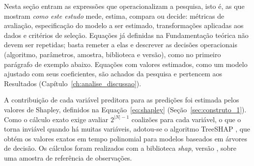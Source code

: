 \begin{orientacao}
  Nesta seção entram as expressões que operacionalizam a pesquisa, isto é, as que mostram \emph{como este estudo} mede, estima, compara ou decide: métricas de avaliação, especificação do modelo a ser estimado, transformações aplicadas aos dados e critérios de seleção. Equações já definidas na Fundamentação teórica não devem ser repetidas; basta remeter a elas e descrever as decisões operacionais (algoritmo, parâmetros, amostra, biblioteca e versão), como no primeiro parágrafo de exemplo abaixo. Equações com valores estimados, como um modelo ajustado com seus coeficientes, são achados da pesquisa e pertencem aos Resultados (Capítulo~\ref{ch:analise_discussao}).
\end{orientacao}

A contribuição de cada variável preditora para as predições foi estimada pelos valores de Shapley, definidos na Equação~\eqref{eq:shapley} (Seção~\ref{sec:construto_1}). Como o cálculo exato exige avaliar $2^{|N|-1}$ coalizões para cada variável, o que o torna inviável quando há muitas variáveis, adotou-se o algoritmo TreeSHAP \cite{Lundberg2020}, que obtém os valores exatos em tempo polinomial para modelos baseados em árvores de decisão. Os cálculos foram realizados com a biblioteca \textit{shap}, versão , sobre uma amostra de referência de  observações.

